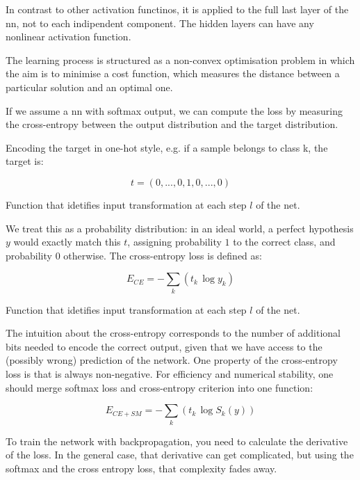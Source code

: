 \noindent In contrast to other activation functinos, it is applied to the full last layer of the \gls{nn}, not to each indipendent component. The hidden layers can have any nonlinear activation function.

\noindent The learning process is structured as a non-convex optimisation problem in which the aim is to minimise a cost function, which measures the distance between a particular solution and an optimal one.

\noindent If we assume a \gls{nn} with softmax output, we can compute the loss by measuring the cross-entropy between the output distribution and the target distribution.

\noindent Encoding the target in one-hot style, e.g. if a sample belongs to class k, the target is:

\begin{Equation}[H]
	\centering
	\begin{equation}
		t=(0,...,0,1,0,...,0)
	\end{equation}
	\caption[Forward propagation.]{Function that idetifies input transformation at each step $l$ of the net.}
	\label{eq:activationfun}
\end{Equation}

\noindent We treat this as a probability distribution: in an ideal world, a perfect hypothesis $y$ would exactly match this $t$, assigning probability $1$ to the correct class, and probability $0$ otherwise. The cross-entropy loss is defined as:

\begin{Equation}[H]
	\centering
	\begin{equation}
		E_{CE} = -\sum_{k}(t_k \, \log y_k)
	\end{equation}
	\caption[Forward propagation.]{Function that idetifies input transformation at each step $l$ of the net.}
	\label{eq:activationfun}
\end{Equation}

\noindent The intuition about the cross-entropy corresponds to the number of additional bits needed to encode the
correct output, given that we have access to the (possibly wrong) prediction of the network. One property of the cross-entropy loss is that is always non-negative. For efficiency and numerical stability, one should merge
softmax loss and cross-entropy criterion into one function:

\begin{Equation}[H]
	\centering
	\begin{equation}
		E_{CE+SM} = -\sum_{k}(t_k \, \log S_k(y))
	\end{equation}
	\caption[Softmax cross entropy.]{To train the network with backpropagation, you need to calculate the derivative of the loss. In the general case, that derivative can get complicated, but using the softmax and the cross entropy loss, that complexity fades away.}
	\label{eq:softmaxcrossentr}
\end{Equation}

